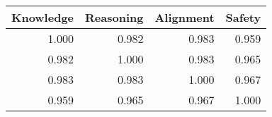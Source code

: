 \begin{tabular}{rrrr}
\toprule
Knowledge & Reasoning & Alignment & Safety \\
\midrule
1.000 & 0.982 & 0.983 & 0.959 \\
0.982 & 1.000 & 0.983 & 0.965 \\
0.983 & 0.983 & 1.000 & 0.967 \\
0.959 & 0.965 & 0.967 & 1.000 \\
\bottomrule
\end{tabular}
